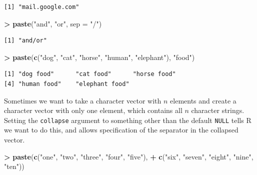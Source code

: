 \documentclass[]{krantz}
\makeatletter
\newenvironment{Shaded}{\begin{snugshade}}{\end{snugshade}}
\newcommand{\KeywordTok}[1]{\textcolor[rgb]{0.27,0.27,0.27}{\textbf{#1}}}
\newcommand{\DataTypeTok}[1]{\textcolor[rgb]{0.27,0.27,0.27}{#1}}
\newcommand{\StringTok}[1]{\textcolor[rgb]{0.5,0.5,0.5}{#1}}
\newcommand{\OperatorTok}[1]{\textcolor[rgb]{0.43,0.43,0.43}{\textbf{#1}}}
\newcommand{\NormalTok}[1]{#1}
\newenvironment{kframe}{%
\medskip{}
\setlength{\fboxsep}{.8em}
 \def\at@end@of@kframe{}%
 \ifinner\ifhmode%
  \def\at@end@of@kframe{\end{minipage}}%
  \begin{minipage}{\columnwidth}%
 \fi\fi%
 \def\FrameCommand##1{\hskip\@totalleftmargin \hskip-\fboxsep
 \colorbox{shadecolor}{##1}\hskip-\fboxsep
     \hskip-\linewidth \hskip-\@totalleftmargin \hskip\columnwidth}%
 \MakeFramed {\advance\hsize-\width
   \@totalleftmargin\z@ \linewidth\hsize
   \@setminipage}}%
 {\par\unskip\endMakeFramed%
 \at@end@of@kframe}
\renewenvironment{Shaded}{\begin{kframe}}{\end{kframe}}
\makeatother
\begin{document}
\begin{verbatim}
[1] "mail.google.com"
\end{verbatim}

\begin{Shaded}
\begin{Highlighting}[]
\OperatorTok{>}\StringTok{ }\KeywordTok{paste}\NormalTok{(}\StringTok{"and"}\NormalTok{, }\StringTok{"or"}\NormalTok{, }\DataTypeTok{sep =} \StringTok{"/"}\NormalTok{)}
\end{Highlighting}
\end{Shaded}

\begin{verbatim}
[1] "and/or"
\end{verbatim}

\begin{Shaded}
\begin{Highlighting}[]
\OperatorTok{>}\StringTok{ }\KeywordTok{paste}\NormalTok{(}\KeywordTok{c}\NormalTok{(}\StringTok{"dog"}\NormalTok{, }\StringTok{"cat"}\NormalTok{, }\StringTok{"horse"}\NormalTok{, }\StringTok{"human"}\NormalTok{, }\StringTok{"elephant"}\NormalTok{), }\StringTok{"food"}\NormalTok{)}
\end{Highlighting}
\end{Shaded}

\begin{verbatim}
[1] "dog food"      "cat food"      "horse food"   
[4] "human food"    "elephant food"
\end{verbatim}

Sometimes we want to take a character vector with \(n\) elements and
create a character vector with only one element, which contains all
\(n\) character strings. Setting the \texttt{collapse} argument to
something other than the default \texttt{NULL} tells R we want to do
this, and allows specification of the separator in the collapsed vector.

\begin{Shaded}
\begin{Highlighting}[]
\OperatorTok{>}\StringTok{ }\KeywordTok{paste}\NormalTok{(}\KeywordTok{c}\NormalTok{(}\StringTok{"one"}\NormalTok{, }\StringTok{"two"}\NormalTok{, }\StringTok{"three"}\NormalTok{, }\StringTok{"four"}\NormalTok{, }\StringTok{"five"}\NormalTok{), }
\OperatorTok{+}\StringTok{       }\KeywordTok{c}\NormalTok{(}\StringTok{"six"}\NormalTok{, }\StringTok{"seven"}\NormalTok{, }\StringTok{"eight"}\NormalTok{, }\StringTok{"nine"}\NormalTok{, }\StringTok{"ten"}\NormalTok{))}
\end{Highlighting}
\end{Shaded}
\end{document}

